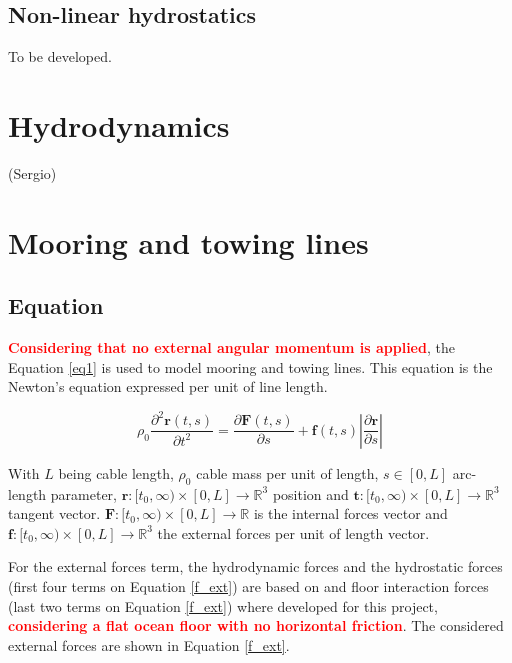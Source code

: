 \documentclass[10pt] {article}
\newcommand{\pa}{\partial}
\begin{document}
\subsection{Non-linear hydrostatics}
To be developed.

\section{Hydrodynamics}
(Sergio)


\clearpage
\section{Mooring and towing lines}
\subsection{Equation} 

\textbf{\textcolor{Red}{Considering that no external angular momentum is applied}}, the Equation \ref{eq1} is used to model mooring and towing lines. This equation is the Newton's equation expressed per unit of line length.

\begin{equation}
\rho_{0} \frac{\pa^2 \mathbf{r}(t,s)}{\pa t^2} = \frac{\pa \mathbf{F}(t,s)}{\pa s} + \mathbf{f}(t,s)\left|\frac{\pa \mathbf{r}}{\pa s}\right| \label{eq1} 
\end{equation}

With $L$ being cable length, $\rho_0$ cable mass per unit of length, $s \in [0,L]$ arc-length parameter, $\mathbf{r}:[t_{0},\infty)\times[0,L] \rightarrow \mathbb{R}^{3}$ position and $\mathbf{t}:[t_{0},\infty)\times[0,L] \rightarrow \mathbb{R}^{3}$ tangent vector. $\mathbf{F}:[t_{0},\infty)\times[0,L] \rightarrow \mathbb{R}$ is the internal forces vector and $\mathbf{f}:[t_{0},\infty)\times[0,L] \rightarrow \mathbb{R}^{3}$ the external forces per unit of length vector.
 
For the external forces term, the hydrodynamic forces and the hydrostatic forces (first four terms on Equation \ref{f_ext}) are based on \cite{Aamo-2000} and floor interaction forces (last two terms on Equation \ref{f_ext}) where developed for this project, \textbf{\textcolor{Red}{considering a flat ocean floor with no horizontal friction}}. The considered external forces are shown in Equation \ref{f_ext}.
 
\end{document}
